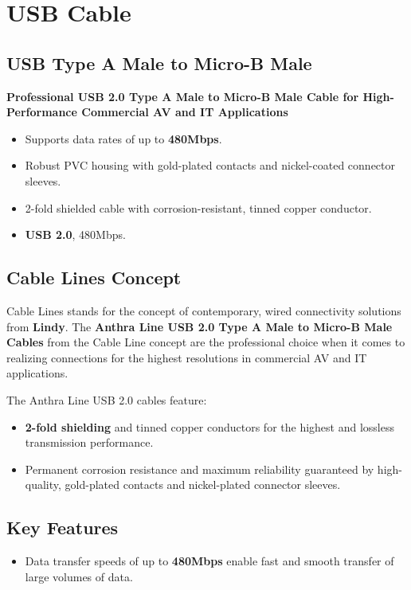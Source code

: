 \section{USB Cable}
\subsection{USB Type A Male to Micro-B Male}

\textbf{Professional USB 2.0 Type A Male to Micro-B Male Cable for High-Performance Commercial AV and IT Applications}
\begin{itemize}[noitemsep]
	\item Supports data rates of up to \textbf{480Mbps}.
	\item Robust PVC housing with gold-plated contacts and nickel-coated connector sleeves.
	\item 2-fold shielded cable with corrosion-resistant, tinned copper conductor.
	\item \textbf{USB 2.0}, 480Mbps.
\end{itemize}

\subsection{Cable Lines Concept}
Cable Lines stands for the concept of contemporary, wired connectivity solutions from \textbf{Lindy}. The \textbf{Anthra Line USB 2.0 Type A Male to Micro-B Male Cables} from the Cable Line concept are the professional choice when it comes to realizing connections for the highest resolutions in commercial AV and IT applications.

The Anthra Line USB 2.0 cables feature:
\begin{itemize}[noitemsep]
	\item \textbf{2-fold shielding} and tinned copper conductors for the highest and lossless transmission performance.
	\item Permanent corrosion resistance and maximum reliability guaranteed by high-quality, gold-plated contacts and nickel-plated connector sleeves.
\end{itemize}

\subsection{Key Features}
\begin{itemize}[noitemsep]
	\item Data transfer speeds of up to \textbf{480Mbps} enable fast and smooth transfer of large volumes of data.
\end{itemize}

